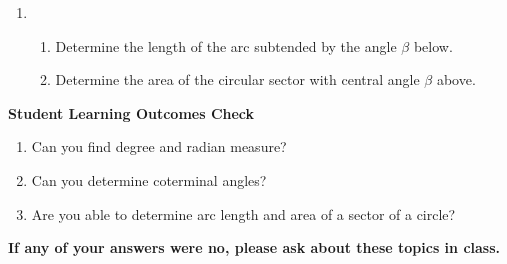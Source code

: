 \begin{enumerate}
\item \begin{enumerate}
\item Determine the length of the arc subtended by the angle $\beta$ below. \\
 \vfill
\item Determine the area of the circular sector with central angle $\beta$ above. 
\end{enumerate}


\vfill









\end{enumerate}

\noindent \textbf{Student Learning Outcomes Check}

\begin{enumerate}
\item Can you find degree and radian measure?
\item Can you determine coterminal angles?
\item Are you able to determine arc length and area of a sector of a circle?
\end{enumerate}

\noindent \textbf{If any of your answers were no, please ask about these topics in class.}

